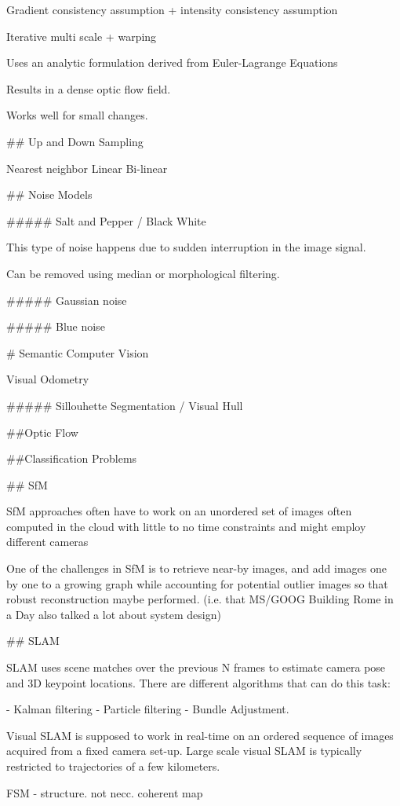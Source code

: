Gradient consistency assumption + intensity consistency assumption

Iterative multi scale + warping

Uses an analytic formulation derived from Euler-Lagrange Equations

Results in a dense optic flow field.

Works well for small changes.

## Up and Down Sampling

Nearest neighbor
Linear
Bi-linear

## Noise Models

##### Salt and Pepper / Black White

This type of noise happens due to sudden interruption in the image signal.

Can be removed using median or morphological filtering.

##### Gaussian noise

##### Blue noise

# Semantic Computer Vision

Visual Odometry

##### Sillouhette Segmentation / Visual Hull

##Optic Flow

##Classification Problems

## SfM

 SfM approaches often have to work on an unordered set of images often computed in the cloud with little to no time constraints and might employ different cameras

One of the challenges in SfM is to retrieve near-by images, and add images one by one to a growing graph while accounting for potential outlier images so that robust reconstruction maybe performed. (i.e. that MS/GOOG Building  Rome in a Day also talked a lot about system design)

## SLAM

SLAM uses scene matches over the previous N frames to estimate camera pose and 3D keypoint locations. There are different algorithms that can do this task:

- Kalman filtering
- Particle filtering
- Bundle Adjustment.

Visual SLAM is supposed to work in real-time on an ordered sequence of images acquired from a fixed camera set-up. Large scale visual SLAM is typically restricted to trajectories of a few kilometers.

FSM - structure. not necc. coherent map

